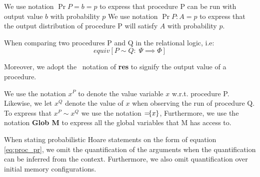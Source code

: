 We use notation $\Pr{P = b} = p$ to express that procedure P can be run with
output value $b$ with probability $p$
We use notation $\Pr{P : A} = p$ to express that the output distribution of
procedure P will satisfy $A$ with probability $p$.

When comparing two procedures P and Q in the relational logic, i.e:
\[
  equiv[P \sim Q :\; \Psi \implies \Phi]
\]

Moreover, we adopt the \easycrypt\ notation of \textbf{res} to signify the
output value of a procedure.

We use the notation $x^{P}$ to denote the value variable $x$ w.r.t. procedure P.
Likewise, we let $x^{Q}$ denote the value of $x$ when observing the run of
procedure Q. To express that $x^{P} \sim x^{Q}$ we use the notation ${=}\!\{x\}$,
Furthermore, we use the notation \textbf{Glob M} to express all the global
variables that M has access to.

When stating probabilistic Hoare statements on the form of equation
\ref{eq:proc_pr}, we omit the quantification of the arguments when the
quantification can be inferred from the context. Furthermore, we also omit
quantification over initial memory configurations.

